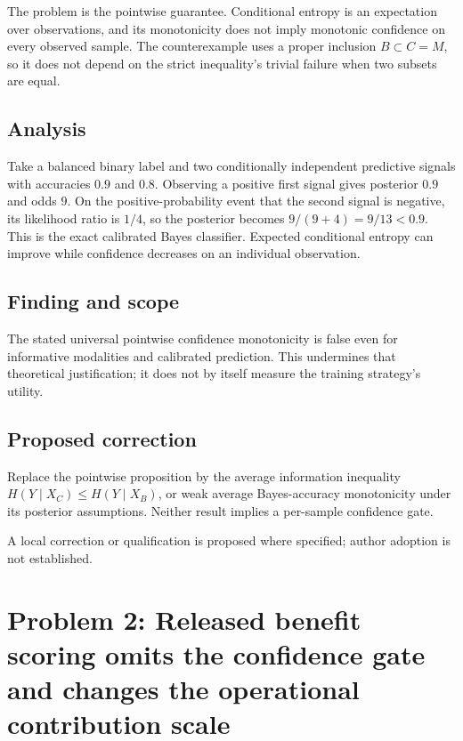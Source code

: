 \documentclass[11pt]{article}
\begin{document}
The problem is the pointwise guarantee. Conditional entropy is an expectation over observations, and its monotonicity does not imply monotonic confidence on every observed sample. The counterexample uses a proper inclusion \(B\subset C=M\), so it does not depend on the strict inequality’s trivial failure when two subsets are equal.

\subsection*{Analysis}

Take a balanced binary label and two conditionally independent predictive signals with accuracies \(0.9\) and \(0.8\). Observing a positive first signal gives posterior \(0.9\) and odds \(9\). On the positive-probability event that the second signal is negative, its likelihood ratio is \(1/4\), so the posterior becomes \(9/(9+4)=9/13<0.9\). This is the exact calibrated Bayes classifier. Expected conditional entropy can improve while confidence decreases on an individual observation.

\subsection*{Finding and scope}

The stated universal pointwise confidence monotonicity is false even for informative modalities and calibrated prediction. This undermines that theoretical justification; it does not by itself measure the training strategy's utility.

\subsection*{Proposed correction}

Replace the pointwise proposition by the average information inequality \(H(Y\mid X_C)\le H(Y\mid X_B)\), or weak average Bayes-accuracy monotonicity under its posterior assumptions. Neither result implies a per-sample confidence gate.

A local correction or qualification is proposed where specified; author adoption is not established.

\section*{Problem 2: Released benefit scoring omits the confidence gate and changes the operational contribution scale}
\end{document}
